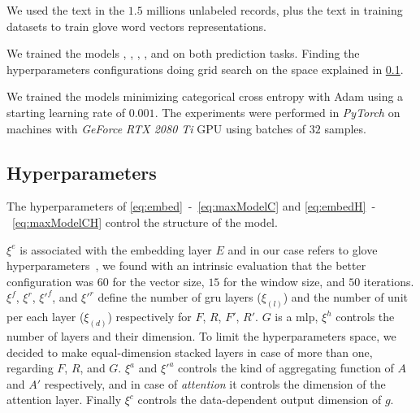 We used the text in the $1.5$ millions unlabeled records, plus the
text in training datasets to train \ac{glove} word
vectors representations.

We trained the models \maxp{}, \softmax{}, \maxi{}, \maxh{}, and
\softmaxh{} on both prediction tasks. Finding the hyperparameters 
configurations doing grid search on the space explained in
\cref{sec:hyperparameters}. 

We trained the models minimizing categorical cross entropy with Adam
\cite{kingma2014adam} using a starting learning rate of $0.001$. The
experiments were performed in \emph{PyTorch} on machines with
\emph{GeForce RTX 2080 Ti} 
GPU using batches of $32$ samples.



\subsection{Hyperparameters}\label{sec:hyperparameters}
The hyperparameters of \eqref{eq:embed}~-~\eqref{eq:maxModelC}
and \eqref{eq:embedH}~-~\eqref{eq:maxModelCH} control the structure of
the model.

$\xi^e$ is associated with the embedding layer $E$ and in our case
refers to \ac{glove} 
hyperparameters~\cite{pennington_glove:_2014}, we found with an
intrinsic evaluation that the better configuration was $60$ for the vector
size, $15$ for the window size, and $50$ iterations. $\xi^f$,
$\xi^r$, $\xi'^{f}$, and $\xi'^{r}$ define the number of
\ac{gru} layers ($\xi_{(l)}$) and the number of unit per each layer
($\xi_{(d)}$) respectively for $F$, $R$, $F'$, $R'$. 
$G$ is a \ac{mlp}, $\xi^h$ controls the number of
layers and their dimension. To limit the
hyperparameters space, we decided to
make equal-dimension stacked layers in case of more than one,
regarding $F$, $R$, and $G$. $\xi^a$ and $\xi'^a$ controls the
kind of aggregating function of $A$ and $A'$ respectively, and in case
of \emph{attention} 
it controls the dimension of the attention layer. Finally $\xi^c$ controls the
data-dependent output dimension of $g$.

